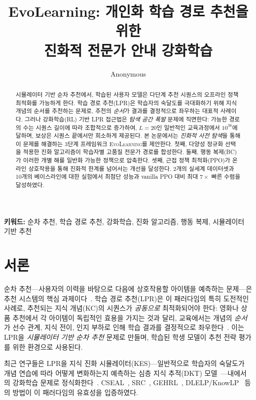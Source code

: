 \documentclass[11pt,a4paper]{article}
\title{\textbf{EvoLearning: 개인화 학습 경로 추천을 위한\\진화적 전문가 안내 강화학습}}
\author{Anonymous}
\date{}
\newcommand{\ours}{\textsc{EvoLearning}}
\begin{document}
\maketitle

\begin{abstract}
시뮬레이터 기반 순차 추천에서, 학습된 사용자 모델은 다단계 추천 시퀀스의 오프라인 정책 최적화를 가능하게 한다. 학습 경로 추천(LPR)은 학습자의 숙달도를 극대화하기 위해 지식 개념의 순서를 추천하는 문제로, 추천의 \emph{순서}가 결과를 결정적으로 좌우하는 대표적 사례이다. 그러나 강화학습(RL) 기반 LPR 접근법은 \emph{탐색 공간 폭발} 문제에 직면한다: 가능한 경로의 수는 시퀀스 길이에 따라 조합적으로 증가하여, $L=20$인 일반적인 교육과정에서 $10^{38}$에 달하며, 보상은 시퀀스 끝에서만 희소하게 제공된다. 본 논문에서는 \emph{진화적 사전 탐색}을 통해 이 문제를 해결하는 3단계 프레임워크 \ours{}를 제안한다. 첫째, 다양성 정규화 선택을 적용한 진화 알고리즘이 학습자별 고품질 전문가 경로를 합성한다. 둘째, 행동 복제(BC)가 이러한 개별 해를 일반화 가능한 정책으로 압축한다. 셋째, 근접 정책 최적화(PPO)가 온라인 상호작용을 통해 진화적 한계를 넘어서는 개선을 달성한다. 2개의 실세계 데이터셋과 10개의 베이스라인에 대한 실험에서 최첨단 성능과 vanilla PPO 대비 최대 $7\times$ 빠른 수렴을 달성하였다.
\end{abstract}

\textbf{키워드:} 순차 추천, 학습 경로 추천, 강화학습, 진화 알고리즘, 행동 복제, 시뮬레이터 기반 추천

\section{서론}

순차 추천---사용자의 이력을 바탕으로 다음에 상호작용할 아이템을 예측하는 문제---은 추천 시스템의 핵심 과제이다~\cite{hidasi2016gru4rec}. 학습 경로 추천(LPR)은 이 패러다임의 특히 도전적인 사례로, 추천되는 지식 개념(KC)의 시퀀스가 \emph{공동으로} 최적화되어야 한다: 영화나 상품 추천에서 각 아이템이 독립적인 효용을 가지는 것과 달리, 교육에서는 개념의 \emph{순서}가 선수 관계, 지식 전이, 인지 부하로 인해 학습 결과를 결정적으로 좌우한다~\cite{liu2019cseal,li2023gehrl,cheng2025knowlp}. 이는 LPR을 \emph{시뮬레이터 기반 순차 추천} 문제로 만들며, 학습된 학생 모델이 추천 전략 평가를 위한 환경으로 사용된다.

최근 연구들은 LPR을 지식 진화 시뮬레이터(KES)---일반적으로 학습자의 숙달도가 개념 연습에 따라 어떻게 변화하는지 예측하는 심층 지식 추적(DKT) 모델~\cite{piech2015dkt}---내에서의 강화학습 문제로 정식화한다~\cite{liu2019cseal}. CSEAL~\cite{liu2019cseal}, SRC~\cite{wang2023src}, GEHRL~\cite{li2023gehrl}, DLELP/KnowLP~\cite{cheng2025knowlp} 등의 방법이 이 패러다임의 유효성을 입증하였다.
\end{document}

